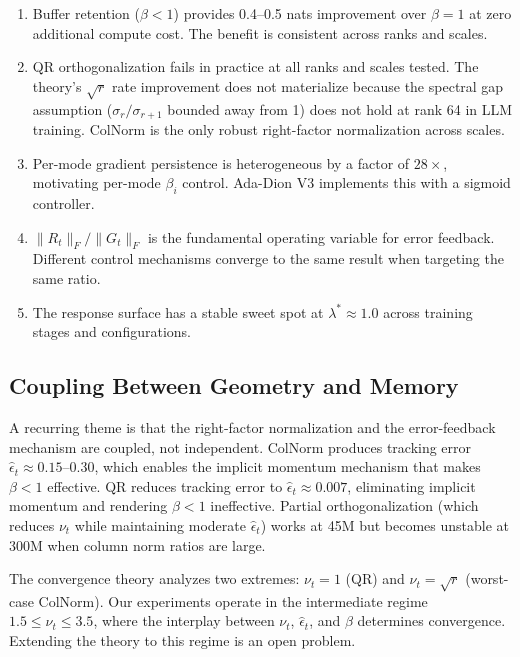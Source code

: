 \documentclass[11pt]{article}
\newcommand{\norm}[1]{\|#1\|}
\begin{document}
\begin{enumerate}
    \item Buffer retention ($\beta < 1$) provides 0.4--0.5 nats improvement over $\beta = 1$ at zero additional compute cost. The benefit is consistent across ranks and scales.

    \item QR orthogonalization fails in practice at all ranks and scales tested. The theory's $\sqrt{r}$ rate improvement does not materialize because the spectral gap assumption ($\sigma_r / \sigma_{r+1}$ bounded away from 1) does not hold at rank 64 in LLM training. ColNorm is the only robust right-factor normalization across scales.

    \item Per-mode gradient persistence is heterogeneous by a factor of $28\times$, motivating per-mode $\beta_i$ control. Ada-Dion V3 implements this with a sigmoid controller.

    \item $\norm{R_t}_F / \norm{G_t}_F$ is the fundamental operating variable for error feedback. Different control mechanisms converge to the same result when targeting the same ratio.

    \item The response surface has a stable sweet spot at $\lambda^* \approx 1.0$ across training stages and configurations.
\end{enumerate}

\subsection{Coupling Between Geometry and Memory}

A recurring theme is that the right-factor normalization and the error-feedback mechanism are coupled, not independent. ColNorm produces tracking error $\hat{\epsilon}_t \approx 0.15$--$0.30$, which enables the implicit momentum mechanism that makes $\beta < 1$ effective. QR reduces tracking error to $\hat{\epsilon}_t \approx 0.007$, eliminating implicit momentum and rendering $\beta < 1$ ineffective. Partial orthogonalization (which reduces $\nu_t$ while maintaining moderate $\hat{\epsilon}_t$) works at 45M but becomes unstable at 300M when column norm ratios are large.

The convergence theory analyzes two extremes: $\nu_t = 1$ (QR) and $\nu_t = \sqrt{r}$ (worst-case ColNorm). Our experiments operate in the intermediate regime $1.5 \leq \nu_t \leq 3.5$, where the interplay between $\nu_t$, $\hat{\epsilon}_t$, and $\beta$ determines convergence. Extending the theory to this regime is an open problem.
\end{document}
